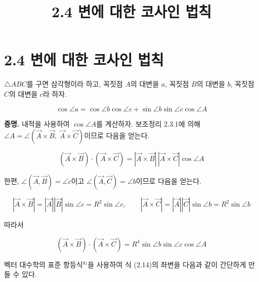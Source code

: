 \documentclass{article}
\title{2.4 변에 대한 코사인 법칙}
\date{}
\author{}
\begin{document}
\maketitle

\section*{2.4 변에 대한 코사인 법칙}

$\triangle ABC$를 구면 삼각형이라 하고, 꼭짓점 $A$의 대변을 $a$, 꼭짓점 $B$의 대변을 $b$, 꼭짓점 $C$의 대변을 $c$라 하자.

\begin{tcolorbox}[
  colback=red!4, colframe=red!60!black,
  title=정리 2.4.1 (변에 대한 코사인 법칙),
  fonttitle=\bfseries, boxrule=0.5mm, arc=3mm]

\[
  \cos\angle a = \cos\angle b\cos\angle c + \sin\angle b\sin\angle c\cos\angle A
\]

\end{tcolorbox}

\textbf{증명.}\quad
내적을 사용하여 $\cos\angle A$를 계산하자.
보조정리 2.3.1에 의해 $\angle A = \angle(\vec{A}\times\vec{B},\;\vec{A}\times\vec{C})$이므로 다음을 얻는다.

\[
  (\vec{A}\times\vec{B})\cdot(\vec{A}\times\vec{C})
  = |\vec{A}\times\vec{B}|\,|\vec{A}\times\vec{C}|\cos\angle A
\]

한편, $\angle(\vec{A},\vec{B}) = \angle c$이고 $\angle(\vec{A},\vec{C}) = \angle b$이므로 다음을 얻는다.

\[
  |\vec{A}\times\vec{B}| = |\vec{A}||\vec{B}|\sin\angle c = R^2\sin\angle c,\qquad
  |\vec{A}\times\vec{C}| = |\vec{A}||\vec{C}|\sin\angle b = R^2\sin\angle b
\]

따라서

\begin{equation}
  (\vec{A}\times\vec{B})\cdot(\vec{A}\times\vec{C})
  = R^4\sin\angle b\sin\angle c\cos\angle A \tag{2.14}
\end{equation}

벡터 대수학의 표준 항등식$^{8)}$을 사용하여 식 (2.14)의 좌변을 다음과 같이 간단하게 만들 수 있다.
\end{document}
